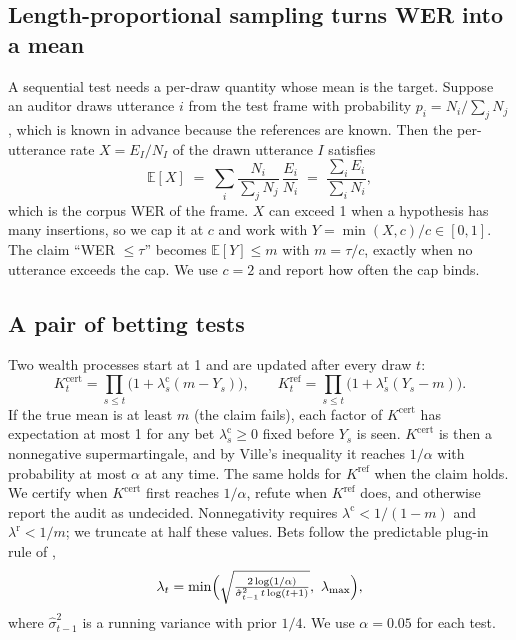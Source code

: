 \subsection{Length-proportional sampling turns WER into a mean}

A sequential test needs a per-draw quantity whose mean is the target. Suppose an auditor draws utterance $i$ from the test frame with probability $p_i = N_i / \sum_j N_j$, which is known in advance because the references are known. Then the per-utterance rate $X = E_I/N_I$ of the drawn utterance $I$ satisfies
\begin{equation}
  \mathbb{E}[X] \;=\; \sum_i \frac{N_i}{\sum_j N_j}\,\frac{E_i}{N_i} \;=\; \frac{\sum_i E_i}{\sum_i N_i},
\end{equation}
which is the corpus WER of the frame. $X$ can exceed 1 when a hypothesis has many insertions, so we cap it at $c$ and work with $Y = \min(X, c)/c \in [0, 1]$. The claim ``WER $\le \tau$'' becomes $\mathbb{E}[Y] \le m$ with $m = \tau/c$, exactly when no utterance exceeds the cap. We use $c = 2$ and report how often the cap binds.

\subsection{A pair of betting tests}

Two wealth processes start at 1 and are updated after every draw $t$:
\begin{equation}
  K^{\mathrm{cert}}_t = \prod_{s \le t} \bigl(1 + \lambda^{\mathrm{c}}_s (m - Y_s)\bigr), \qquad
  K^{\mathrm{ref}}_t  = \prod_{s \le t} \bigl(1 + \lambda^{\mathrm{r}}_s (Y_s - m)\bigr).
\end{equation}
If the true mean is at least $m$ (the claim fails), each factor of $K^{\mathrm{cert}}$ has expectation at most 1 for any bet $\lambda^{\mathrm{c}}_s \ge 0$ fixed before $Y_s$ is seen. $K^{\mathrm{cert}}$ is then a nonnegative supermartingale, and by Ville's inequality it reaches $1/\alpha$ with probability at most $\alpha$ at any time. The same holds for $K^{\mathrm{ref}}$ when the claim holds. We certify when $K^{\mathrm{cert}}$ first reaches $1/\alpha$, refute when $K^{\mathrm{ref}}$ does, and otherwise report the audit as undecided. Nonnegativity requires $\lambda^{\mathrm{c}} < 1/(1-m)$ and $\lambda^{\mathrm{r}} < 1/m$; we truncate at half these values. Bets follow the predictable plug-in rule of \citet{waudbysmith2020betting},
\begin{equation}
  \lambda_t = \min\Bigl(\sqrt{\tfrac{2\log(1/\alpha)}{\hat\sigma^2_{t-1}\, t \log(t+1)}},\ \lambda_{\max}\Bigr),
\end{equation}
where $\hat\sigma^2_{t-1}$ is a running variance with prior $1/4$. We use $\alpha = 0.05$ for each test.

